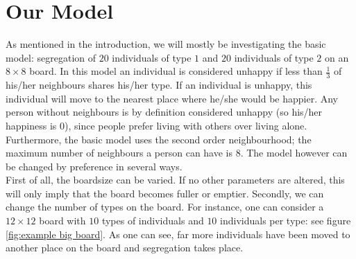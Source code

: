 \section{Our Model}
As mentioned in the introduction, we will mostly be investigating the basic model: segregation of $20$ individuals of type $1$ and $20$ individuals of type $2$ on an $8 \times 8$ board.
In this model an individual is considered unhappy if less than \(\frac{1}{3}\) of his/her neighbours shares his/her type. If an individual is unhappy, this individual will move to the nearest place where he/she would be happier.
Any person without neighbours is by definition considered unhappy (so his/her happiness is $0$), since people prefer living with others over living alone.
Furthermore, the basic model uses the second order neighbourhood; the maximum number of neighbours a person can have is 8. 
The model however can be changed by preference in several ways.\\

First of all, the boardsize can be varied.
If no other parameters are altered, this will only imply that the board becomes fuller or emptier.
Secondly, we can change the number of types on the board.
For instance, one can consider a $12\times 12$ board with $10$ types of individuals and $10$ individuals per type: see figure \ref{fig:example big board}.
As one can see, far more individuals have been moved to another place on the board and segregation takes place.

